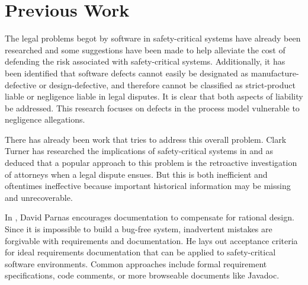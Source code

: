 \section{Previous Work}
The legal problems begot by software in safety-critical systems have already
been researched \cite{Turner1996, Turner2000} and some suggestions have been
made to help alleviate the cost of defending the risk associated with
safety-critical systems\cite{Turner2001}. Additionally, it has been identified
that software defects cannot easily be designated as manufacture-defective or
design-defective\cite{Turner2000}, and therefore cannot be classified as
strict-product liable or negligence liable in legal disputes. It is clear that
both aspects of liability be addressed. This research focuses on defects in the
process model vulnerable to negligence allegations.

There has already been work that tries to address this overall problem. Clark
Turner has researched the implications of safety-critical systems in
\cite{Turner1996, Turner2000, Turner2001} and as deduced that a popular
approach to this problem is the retroactive investigation of attorneys when a
legal dispute ensues. But this is both inefficient and oftentimes ineffective
because important historical information may be missing and unrecoverable.

In \cite{Parnas1986}, David Parnas encourages documentation to compensate for
rational design. Since it is impossible to build a bug-free system, inadvertent
mistakes are forgivable with requirements and documentation. He lays out
acceptance criteria for ideal requirements documentation that can be applied to
safety-critical software environments. Common approaches include formal
requirement specifications, code comments, or more browseable documents like
Javadoc\cite{Javadoc}.
